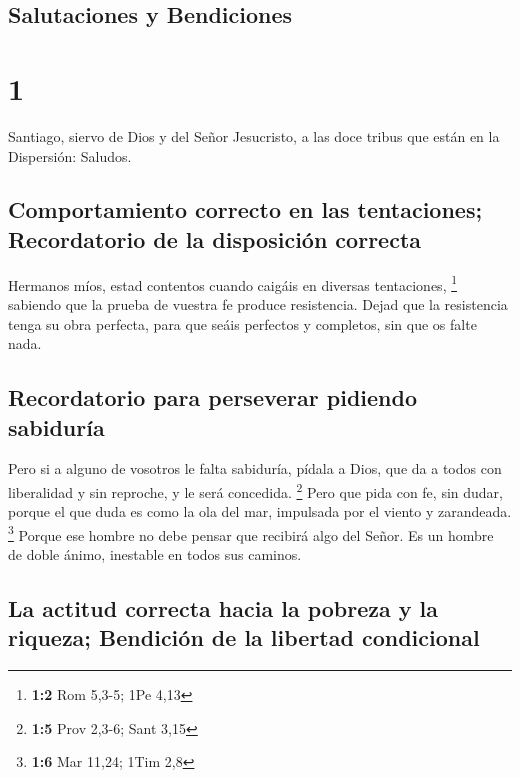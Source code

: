 \hypertarget{salutaciones-y-bendiciones}{%
\subsection{Salutaciones y
Bendiciones}\label{salutaciones-y-bendiciones}}

\hypertarget{section}{%
\section{1}\label{section}}

 Santiago, siervo de Dios y del Señor Jesucristo, a las
doce tribus que están en la Dispersión: Saludos.

\hypertarget{comportamiento-correcto-en-las-tentaciones-recordatorio-de-la-disposiciuxf3n-correcta}{%
\subsection{Comportamiento correcto en las tentaciones; Recordatorio de
la disposición
correcta}\label{comportamiento-correcto-en-las-tentaciones-recordatorio-de-la-disposiciuxf3n-correcta}}

 Hermanos míos, estad contentos cuando caigáis en diversas
tentaciones, \footnote{\textbf{1:2} Rom 5,3-5; 1Pe 4,13} 
sabiendo que la prueba de vuestra fe produce resistencia. 
Dejad que la resistencia tenga su obra perfecta, para que seáis
perfectos y completos, sin que os falte nada.

\hypertarget{recordatorio-para-perseverar-pidiendo-sabiduruxeda}{%
\subsection{Recordatorio para perseverar pidiendo
sabiduría}\label{recordatorio-para-perseverar-pidiendo-sabiduruxeda}}

 Pero si a alguno de vosotros le falta sabiduría, pídala a
Dios, que da a todos con liberalidad y sin reproche, y le será
concedida. \footnote{\textbf{1:5} Prov 2,3-6; Sant 3,15} 
Pero que pida con fe, sin dudar, porque el que duda es como la ola del
mar, impulsada por el viento y zarandeada. \footnote{\textbf{1:6} Mar
  11,24; 1Tim 2,8}  Porque ese hombre no debe pensar que
recibirá algo del Señor.  Es un hombre de doble ánimo,
inestable en todos sus caminos.

\hypertarget{la-actitud-correcta-hacia-la-pobreza-y-la-riqueza-bendiciuxf3n-de-la-libertad-condicional}{%
\subsection{La actitud correcta hacia la pobreza y la riqueza; Bendición
de la libertad
condicional}\label{la-actitud-correcta-hacia-la-pobreza-y-la-riqueza-bendiciuxf3n-de-la-libertad-condicional}}

